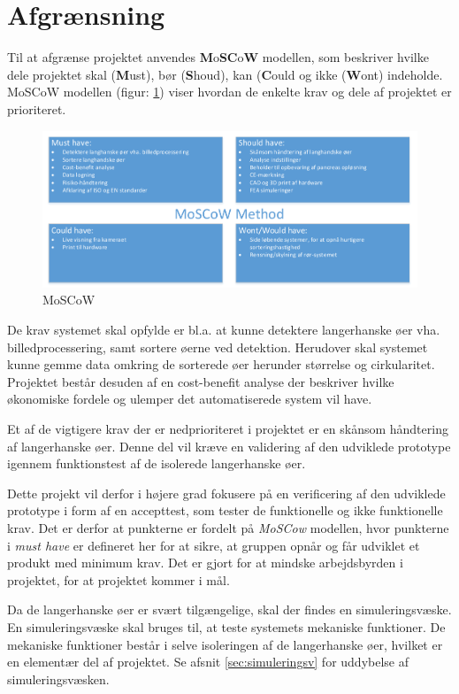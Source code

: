 \newpage
\section{Afgrænsning}
Til at afgrænse projektet anvendes \textbf{M}o\textbf{SC}o\textbf{W} modellen, som beskriver hvilke dele projektet skal (\textbf{M}ust), bør (\textbf{S}houd), kan (\textbf{C}ould og ikke (\textbf{W}ont) indeholde. MoSCoW modellen (figur: \ref{fig:moscow}) viser hvordan de enkelte krav og dele af projektet er prioriteret. 


\begin{figure}[H]
	\centering
	\includegraphics[width=1\textwidth]{billeder/MoSCoW-crop.pdf}
	\caption{MoSCoW}
	\label{fig:moscow}
\end{figure}

De krav systemet skal opfylde er bl.a. at kunne detektere langerhanske øer vha. billedprocessering, samt sortere øerne ved detektion. Herudover skal systemet kunne gemme data omkring de sorterede øer herunder størrelse og cirkularitet. Projektet består desuden af en cost-benefit analyse der beskriver hvilke økonomiske fordele og ulemper det automatiserede system vil have. 

Et af de vigtigere krav der er nedprioriteret i projektet er en skånsom håndtering af langerhanske øer. Denne del vil kræve en validering af den udviklede prototype igennem funktionstest af de isolerede langerhanske øer. %

Dette projekt vil derfor i højere grad fokusere på en verificering af den udviklede prototype i form af en accepttest, som tester de funktionelle og ikke funktionelle krav. Det er derfor at punkterne er fordelt på \textit{MoSCow} modellen, hvor punkterne i \textit{must have} er defineret her for at sikre, at gruppen opnår og får udviklet et produkt med minimum krav. Det er gjort for at mindske arbejdsbyrden i projektet, for at projektet kommer i mål.

Da de langerhanske øer er svært tilgængelige, skal der findes en simuleringsvæske. En simuleringsvæske skal bruges til, at teste systemets mekaniske funktioner. De mekaniske funktioner består i selve isoleringen af de langerhanske øer, hvilket er en elementær del af projektet. Se afsnit \ref{sec:simuleringsv} for uddybelse af simuleringsvæsken.


